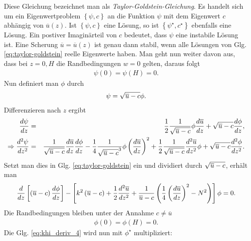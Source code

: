 \documentclass{book}
\newcommand\newoverline[1]{%
\overline{#1}}
\begin{document}
%
Diese Gleichung bezeichnet man als \textit{Taylor-Goldstein-Gleichung}. Es handelt sich um ein Eigenwertproblem $\left\{\psi, c\right\}$ an die Funktion $\psi$ mit dem Eigenwert $c$ abhängig von $\newoverline{u}\left(z\right)$. Ist $\left\{\psi, c\right\}$ eine Lösung, so ist $\left\{\psi^\star, c^\star\right\}$ ebenfalls eine Lösung. Ein postiver Imaginärteil von $c$ bedeutet, dass $\psi$ eine instabile Lösung ist. Eine Scherung $\newoverline{u} = \newoverline{u}\left(z\right)$ ist genau dann stabil, wenn alle Lösungen von Glg. \eqref{eq:taylor-goldstein} reelle Eigenwerte haben. Man geht nun weiter davon aus, dass bei $z = 0, H$ die Randbedingungen $w = 0$ gelten, daraus folgt
%
\begin{eqnarray}
\psi\left(0\right) = \psi\left(H\right) = 0.
\end{eqnarray}
%
Nun definiert man $\phi$ durch
%
\begin{eqnarray}
\psi = \sqrt{\newoverline{u} - c}\phi.
\end{eqnarray}
%
Differenzieren nach $z$ ergibt
%
\begin{eqnarray}
\frac{d\psi}{dz} & = & \frac{1}{2}\frac{1}{\sqrt{\newoverline{u} - c}}\phi\frac{d\newoverline{u}}{dz} + \sqrt{\newoverline{u} - c}\frac{d\phi}{dz},\\
\Rightarrow\frac{d^2\psi}{dz^2} & = & \frac{1}{\sqrt{\newoverline{u} - c}}\frac{d\newoverline{u}}{dz}\frac{d\phi}{dz} - \frac{1}{4}\frac{1}{\sqrt{\newoverline{u} - c}^3}\phi\left(\frac{d\newoverline{u}}{dz}\right)^2 + \frac{1}{2}\frac{1}{\sqrt{\newoverline{u} - c}}\frac{d^2\newoverline{u}}{dz^2}\phi + \sqrt{\newoverline{u} - c}\frac{d^2\phi}{dz^2}.
\end{eqnarray}
%
Setzt man dies in Glg. \eqref{eq:taylor-goldstein} ein und dividiert durch $\sqrt{\newoverline{u} - c}$, erhält man 
%
\begin{eqnarray}
\frac{d}{dz}\left[\left(\newoverline{u} - c\right)\frac{d\phi}{dz}\right] - \left[k^2\left(\newoverline{u} - c\right) + \frac{1}{2}\frac{d^2\newoverline{u}}{dz^2} + \frac{1}{\newoverline{u} - c}\left(\frac{1}{4}\left(\frac{d\newoverline{u}}{dz}\right)^2 - N^2\right)\right]\phi = 0.\label{eq:khi_deriv_4}
\end{eqnarray}
%
Die Randbedingungen bleiben unter der Annahme $c \not= \newoverline{u}$
%
\begin{eqnarray}
\phi\left(0\right) = \phi\left(H\right) = 0.
\end{eqnarray}
%
Die Glg. \eqref{eq:khi_deriv_4} wird nun mit $\phi^\star$ multipliziert:
\end{document}
